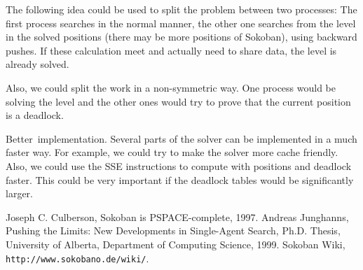 \documentclass[twocolumn]{article}
\newcommand{\heading}[1]{\smallbreak\par\noindent\hbox{\mybf #1}}
\begin{document}
The following idea could be used to split the problem between two processes: The first process searches in the normal manner, the other one searches
from the level in the solved positions (there may be more positions of Sokoban), using backward pushes. If these calculation meet and actually need to
share data, the level is already solved.

Also, we could split the work in a non-symmetric way. One process would be solving the level and the other ones would try to prove that the current
position is a deadlock.

\heading{Better implementation.} Several parts of the solver can be implemented in a much faster way. For example, we could try to make the solver more cache
friendly. Also, we could use the SSE instructions to compute with positions and deadlock faster. This could be very important if the deadlock tables
would be significantly larger.

\begin{thebibliography}{9}
 Joseph C. Culberson, Sokoban is \textsf{PSPACE}-complete, 1997.
 Andreas Junghanns, Pushing the Limits: New Developments in Single-Agent Search, Ph.D. Thesis, University of Alberta, Department of
Computing Science, 1999.
 Sokoban Wiki, {\tt http://www.sokobano.de/wiki/}.
\end{thebibliography}
\end{document}
